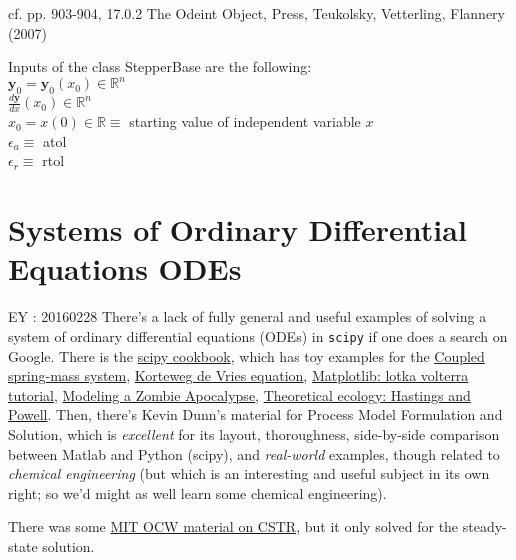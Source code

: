 \documentclass[10pt]{amsart}
\begin{document}
\begin{multicols*}{2}
cf. pp. 903-904, 17.0.2 The Odeint Object, Press, Teukolsky, Vetterling, Flannery (2007) \cite{PTVF2007}

Inputs of the class StepperBase are the following: \\
$\mathbf{y}_0 = \mathbf{y}_0(x_0) \in \mathbb{R}^n$ \\
$\frac{d\mathbf{y}}{dx}(x_0) \in \mathbb{R}^n $ \\
$x_0 = x(0) \in \mathbb{R} \equiv $ starting value of independent variable $x$ \\
$\epsilon_a \equiv $ atol \\
$\epsilon_r \equiv $ rtol \\




\section{Systems of Ordinary Differential Equations ODEs}

EY : 20160228 There's a lack of fully general and useful examples of solving a system of ordinary differential equations (ODEs) in \verb|scipy| if one does a search on Google.  There is the \href{http://scipy-cookbook.readthedocs.org/items/numpy_scipy_ordinary_differential_equations.html}{scipy cookbook}, which has toy examples for the \href{http://scipy-cookbook.readthedocs.org/items/CoupledSpringMassSystem.html}{Coupled spring-mass system}, \href{http://scipy-cookbook.readthedocs.org/items/KdV.html}{Korteweg de Vries equation}, \href{http://scipy-cookbook.readthedocs.org/items/LoktaVolterraTutorial.html}{Matplotlib: lotka volterra tutorial}, \href{http://scipy-cookbook.readthedocs.org/items/Zombie_Apocalypse_ODEINT.html}{Modeling a Zombie Apocalypse}, \href{http://scipy-cookbook.readthedocs.org/items/Theoretical_Ecology_Hastings_and_Powell.html}{Theoretical ecology: Hastings and Powell}.  Then, there's Kevin Dunn's material for Process Model Formulation and Solution, which is \emph{excellent} for its layout, thoroughness, side-by-side comparison between Matlab and Python (scipy), and \emph{real-world} examples, though related to \emph{chemical engineering} (but which is an interesting and useful subject in its own right; so we'd might as well learn some chemical engineering).    

There was some \href{http://ocw.mit.edu/courses/chemical-engineering/10-37-chemical-and-biological-reaction-engineering-spring-2007/lecture-notes/lec05_02212007_g.pdf}{MIT OCW material on CSTR}, but it only solved for the steady-state solution.  


\end{multicols*}
\end{document}
